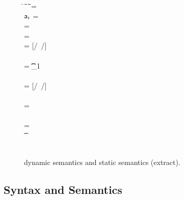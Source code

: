 \documentclass[USenglish]{tex/lipics-v2016}f
\begin{document}
\begin{figure}[!h]
\begin{minipage}{\textwidth}
\begin{tabbing}
\K\HS \New{} \HS\=\s~\HS\=\Red\HS\=\K\HS\=\ap\HS~\= \sp\HS \= \WHERE\HS\= \fresh\ap \HS\HS\HS\HS\HS\HS\HS\=  \sp = {\Map{}}
\\
\K\HS \FReadR\a{\f[i]} \> \s           \>\Red\>     \K \>$\a[i]$ \> \s  \> \WHERE \>\App\s\a=\obj\C{\a[1],\ldots\a[i],\a[n]\ldots}
\\
\K\HS {\FWriteR\a{\f[i]}\ap} \> \s     \>\Red\>     \K \> \ap \> \sp \>  \WHERE \>\App\s\a=\obj\C{\a[1],\ldots\a[i],\a[n]\ldots} \HS  
\\ \> \> \> \> \> \> \> \sp = \Map\s{\Bind\a{\obj\C{\a[1],\ldots\ap,\a[n]\ldots}}}
\\
\K\HS{\KCall\a\m\ap\t\tp} \> \s      \>\Red\>     \K \>  \ep \> \s \> \WHERE\> \ep = {[\a/\this~{\ap/\x}]\e} \HS \\ \> \> \> \> \> \> \> \Mdef\m{}\e\In \App\K\C  \\ \> \> \> \> \> \> \>  \App\s\a=\obj{} \> \StrSub {\emptyset}\K\t {\t_{1}} \\ 
\> \> \> \> \> \> \> \StrSub {\emptyset} \tp
\\
 \K\HS {\DynCall\a\m\ap}\> \s        \>\Red\>    \K \> \ep \> \s \>  \WHERE\> \ep = {[\a/\this~{\ap/\x}]\e}\HS \\ \> \> \> \> \> \> \> \Mdef\m\x\any\any\e \In \App\K\C \\ \> \> \> \> \> \> \> \App\s\a=\obj{} 
\\
 \K\HS {\SubCast \any\a} \> \s       \>\Red\>   \K \> \a \> \s
\\
 \K\HS {\SubCast \D\a} \> \s        \>\Red\>    \K \> \a \> \s \>  \WHERE\> \StrSub {\emptyset}\K\C \D \>\App\s\a=\obj{} 
\\
 \K\HS {\BehCast \t\a} \> \s         \>\Red\>   \Kp \> \ap \> \sp \> \WHERE\> \behcast \a\t\s\K \Kp\ap\sp    
\\
\K \HS \EM{\EE[\e]} \> \s            \>\Red\>   \Kp \> \EM{\EE[\ep]} \> \sp \> \WHERE \> \K~\e~\s \Red~\Kp~\ep~\sp
\end{tabbing}
\end{minipage}

\medskip
\hrulefill
\caption{\kafka dynamic semantics and static semantics
  (extract).}\label{fig:kafka}
\end{figure}


\subsection{Syntax and Semantics}
\end{document}

